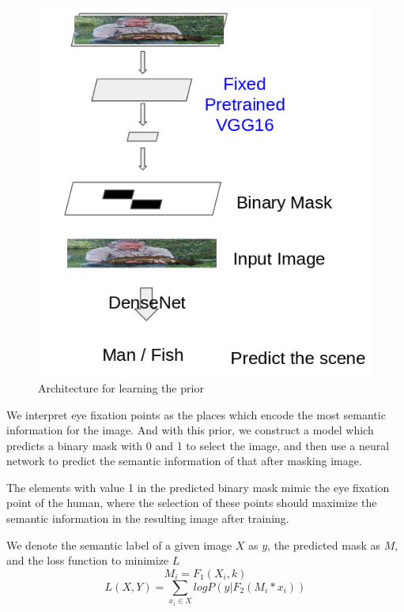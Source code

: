 \documentclass[10pt,twocolumn,letterpaper]{article}
\begin{document}
 \begin{figure}
 	\begin{center}
 		\includegraphics[width=\columnwidth]{figures/Prior.png}
 		
 	\end{center}
 	\caption{Architecture for learning the prior}
 	\label{fig:short}
 \end{figure}
 
 We interpret eye fixation points as the places which encode the most semantic information for the image. And with this prior, we construct a model which predicts a binary mask with 0 and 1 to select the image, and then use a neural network to predict the semantic information of that after masking image. 
 
 The elements with value 1 in the predicted binary mask mimic the eye fixation point of the human, where the selection of these points should maximize the semantic information in the resulting image after training.
 
 We denote the semantic label of a given image $X$ as $y$, the predicted mask as $M$, and the loss function to minimize $L$
 $$M_i = F_1(X_i, k)$$
 $$L(X, Y) = \sum_{x_i \in X}{logP(y | F_2(M_i * x_i))}$$
 
\end{document}
